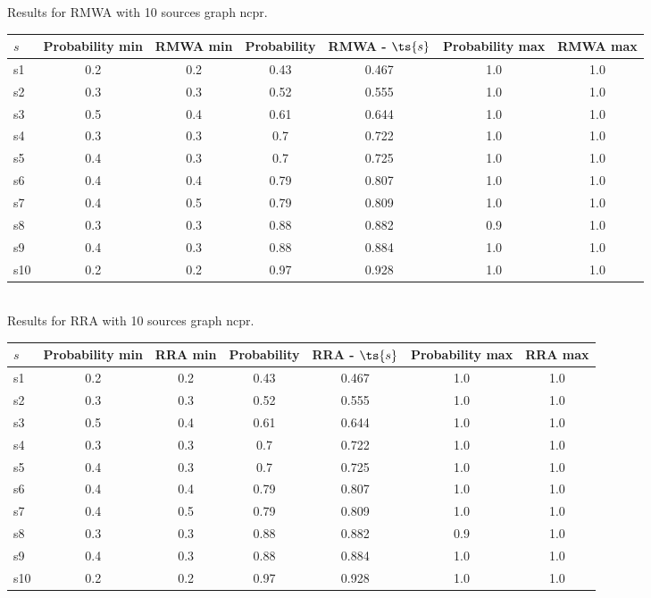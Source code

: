 \documentclass{article}
\begin{document}
\noindent Results for RMWA with 10 sources graph ncpr.

\noindent\begin{tabular}{|l|c|c|c|c|c|c|}
\hline
$s$& Probability min & RMWA min & Probability & RMWA - $\ts{s}$ & Probability max & RMWA max\\
\hline
s1 &0.2 & 0.2 & 0.43 & 0.467 & 1.0 & 1.0\\
\hline
s2 &0.3 & 0.3 & 0.52 & 0.555 & 1.0 & 1.0\\
\hline
s3 &0.5 & 0.4 & 0.61 & 0.644 & 1.0 & 1.0\\
\hline
s4 &0.3 & 0.3 & 0.7 & 0.722 & 1.0 & 1.0\\
\hline
s5 &0.4 & 0.3 & 0.7 & 0.725 & 1.0 & 1.0\\
\hline
s6 &0.4 & 0.4 & 0.79 & 0.807 & 1.0 & 1.0\\
\hline
s7 &0.4 & 0.5 & 0.79 & 0.809 & 1.0 & 1.0\\
\hline
s8 &0.3 & 0.3 & 0.88 & 0.882 & 0.9 & 1.0\\
\hline
s9 &0.4 & 0.3 & 0.88 & 0.884 & 1.0 & 1.0\\
\hline
s10 &0.2 & 0.2 & 0.97 & 0.928 & 1.0 & 1.0\\
\hline
\end{tabular}\\

\noindent Results for RRA with 10 sources graph ncpr.

\noindent\begin{tabular}{|l|c|c|c|c|c|c|}
\hline
$s$& Probability min & RRA min & Probability & RRA - $\ts{s}$ & Probability max & RRA max\\
\hline
s1 &0.2 & 0.2 & 0.43 & 0.467 & 1.0 & 1.0\\
\hline
s2 &0.3 & 0.3 & 0.52 & 0.555 & 1.0 & 1.0\\
\hline
s3 &0.5 & 0.4 & 0.61 & 0.644 & 1.0 & 1.0\\
\hline
s4 &0.3 & 0.3 & 0.7 & 0.722 & 1.0 & 1.0\\
\hline
s5 &0.4 & 0.3 & 0.7 & 0.725 & 1.0 & 1.0\\
\hline
s6 &0.4 & 0.4 & 0.79 & 0.807 & 1.0 & 1.0\\
\hline
s7 &0.4 & 0.5 & 0.79 & 0.809 & 1.0 & 1.0\\
\hline
s8 &0.3 & 0.3 & 0.88 & 0.882 & 0.9 & 1.0\\
\hline
s9 &0.4 & 0.3 & 0.88 & 0.884 & 1.0 & 1.0\\
\hline
s10 &0.2 & 0.2 & 0.97 & 0.928 & 1.0 & 1.0\\
\hline
\end{tabular}\\
\end{document}
